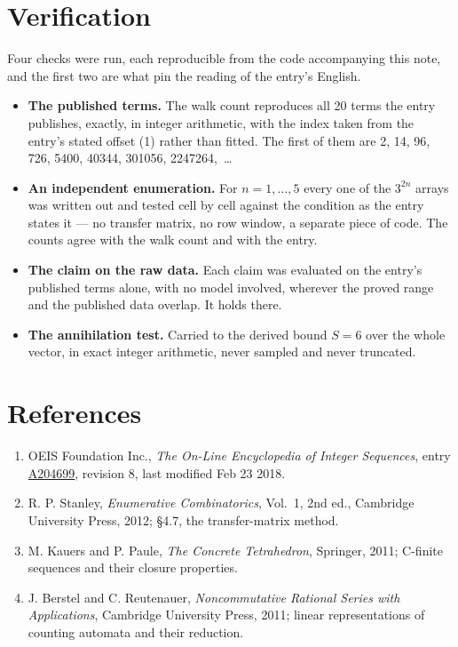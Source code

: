 \documentclass[11pt]{article}
\theoremstyle{definition}
\begin{document}
\section{Verification}

Four checks were run, each reproducible from the code accompanying this note, and the first two are what pin the reading of the entry's English.

\begin{itemize}

\item {\bfseries The published terms.} The walk count reproduces all 20 terms the entry publishes, exactly, in integer arithmetic, with the index taken from the entry's stated offset (1) rather than fitted. The first of them are 2, 14, 96, 726, 5400, 40344, 301056, 2247264,~\dots

\item {\bfseries An independent enumeration.} For $n = 1,\dots,5$ every one of the $3^{2n}$ arrays was written out and tested cell by cell against the condition as the entry states it --- no transfer matrix, no row window, a separate piece of code. The counts agree with the walk count and with the entry.

\item {\bfseries The claim on the raw data.} Each claim was evaluated on the entry's published terms alone, with no model involved, wherever the proved range and the published data overlap. It holds there.

\item {\bfseries The annihilation test.} Carried to the derived bound $S = 6$ over the whole vector, in exact integer arithmetic, never sampled and never truncated.

\end{itemize}

\section{References}

\begin{enumerate}

\item OEIS Foundation Inc., \emph{The On-Line Encyclopedia of Integer Sequences}, entry \href{https://oeis.org/A204699}{A204699}, revision 8, last modified Feb 23 2018.

\item R. P. Stanley, \emph{Enumerative Combinatorics}, Vol.~1, 2nd ed., Cambridge University Press, 2012; \S4.7, the transfer-matrix method.

\item M. Kauers and P. Paule, \emph{The Concrete Tetrahedron}, Springer, 2011; C-finite sequences and their closure properties.

\item J. Berstel and C. Reutenauer, \emph{Noncommutative Rational Series with Applications}, Cambridge University Press, 2011; linear representations of counting automata and their reduction.

\end{enumerate}
\end{document}
